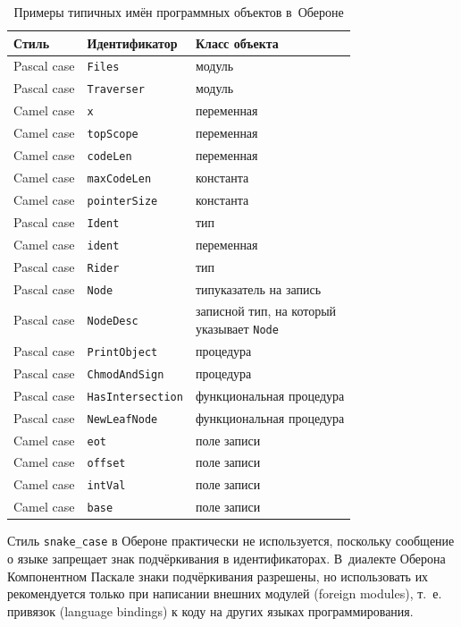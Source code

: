 \documentclass[utf8]{lgu}
\newcommand{\tire}{\unskip\nobreak\thinspace\textemdash\thinspace}
\newcommand{\code}[1]{{\normalsize\texttt{#1}}}
\begin{document}
\begin{table}[H]
\centering
\caption{Примеры типичных имён программных объектов в~Обероне}
\label{tab:OberonIdentifiers}
\vspace{8pt}
\small
\begin{tabular}{@{} l l l @{}}
\toprule
  Стиль & Идентификатор & Класс объекта \\
\midrule
  Pascal case & \code{Files} & модуль \\
  Pascal case & \code{Traverser} & модуль \\
  Camel case & \code{x} & переменная \\
  Camel case & \code{topScope} & переменная \\
  Camel case & \code{codeLen} & переменная \\
  Camel case & \code{maxCodeLen} & константа \\
  Camel case & \code{pointerSize} & константа \\
  Pascal case & \code{Ident} & тип \\
  Camel case & \code{ident} & переменная \\
  Pascal case & \code{Rider} & тип \\
  Pascal case & \code{Node} & тип\tire указатель на запись \\
  Pascal case & \code{NodeDesc} & \parbox{5cm}{\vspace*{4pt}\noindent записной тип, на который \\ указывает \code{Node} \vspace*{4pt}} \\
  Pascal case & \code{PrintObject} & процедура \\
  Pascal case & \code{ChmodAndSign} & процедура \\
  Pascal case & \code{HasIntersection} & функциональная процедура \\
  Pascal case & \code{NewLeafNode} & функциональная процедура \\
  Camel case & \code{eot} & поле записи \\
  Camel case & \code{offset} & поле записи \\
  Camel case & \code{intVal} & поле записи \\
  Camel case & \code{base} & поле записи \\
\bottomrule
\end{tabular}
\end{table}

Стиль \code{snake\_case} в Обероне практически не используется, поскольку сообщение о языке запрещает знак подчёркивания в идентификаторах. В~диалекте Оберона Компонентном Паскале знаки подчёркивания разрешены, но использовать их рекомендуется только при написании внешних модулей (foreign modules), т.~е. привязок (language bindings) к коду на других языках программирования.
\end{document}
